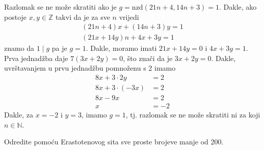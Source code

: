 \documentclass{exam}
\begin{document}
\begin{questions}
\vspace*{-0.93cm}

\renewcommand{\solutiontitle}{\noindent\textbf{2. Rj:}\enspace}
\begin{solution}
  Razlomak se ne može skratiti ako je $g = \text{nzd}(21n + 4, 14n + 3) = 1$. Dakle, ako postoje $x, y \in \mathbb{Z}$ takvi da je za sve $n$ vrijedi
  \begin{eqnarray*}
    (21n + 4)x + (14n + 3)y = 1\\
    (21x + 14y)n + 4x + 3y = 1
  \end{eqnarray*}
  znamo da $1 \mid g$ pa je $g = 1$. Dakle, moramo imati $21x + 14y = 0$ i $4x + 3y = 1$. Prva jednadžba daje $7(3x + 2y) = 0$, što znači da je $3x + 2y = 0$. Dakle, uvrštavanjem u prvu jednadžbu pomnoženu s 2 imamo
  \begin{align*}
    8x + 3 \cdot 2y &= 2\\
    8x + 3 \cdot (-3x) &= 2\\
    8x - 9x &= 2\\
    x &= -2
  \end{align*}
  Dakle, za $x = -2$ i $y = 3$, imamo $g = 1$, tj. razlomak se ne može skratiti ni za koji $n \in \mathbb{N}$.
\end{solution}

\renewcommand{\solutiontitle}{\noindent\textbf{Rj:}\enspace}

\pagebreak

\question Odredite pomoću Erastotenovog sita sve proste brojeve manje od 200.


\end{questions}
\end{document}
